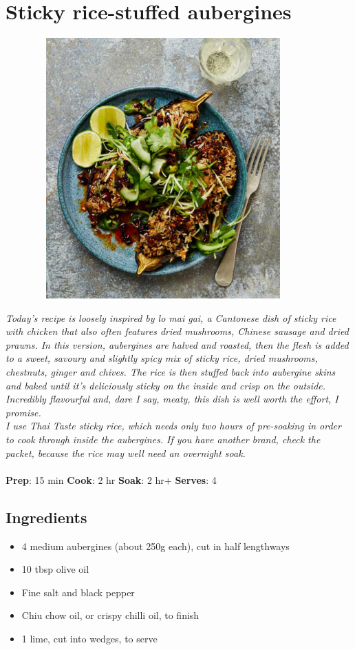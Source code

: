 \documentclass{book}
\begin{document}
\section{Sticky rice-stuffed aubergines}
\begin{figure}
\centering\includegraphics[width=10cm,height=10cm,keepaspectratio]{Recipe_Pictures/Sticky_rice-stuffed_aubergines.png}
\end{figure}
\emph{Today’s recipe is loosely inspired by lo mai gai, a Cantonese dish of sticky rice with chicken that also often features dried mushrooms, Chinese sausage and dried prawns. In this version, aubergines are halved and roasted, then the flesh is added to a sweet, savoury and slightly spicy mix of sticky rice, dried mushrooms, chestnuts, ginger and chives. The rice is then stuffed back into aubergine skins and baked until it’s deliciously sticky on the inside and crisp on the outside. Incredibly flavourful and, dare I say, meaty, this dish is well worth the effort, I promise.\\ 
I use Thai Taste sticky rice, which needs only two hours of pre-soaking in order to cook through inside the aubergines. If you have another brand, check the packet, because the rice may well need an overnight soak.}\\\\ 
\textbf{Prep}: 15 min
\textbf{Cook}: 2 hr
\textbf{Soak}: 2 hr+
\textbf{Serves}: 4
\subsection*{Ingredients}
\begin{itemize}
\item 4 medium aubergines (about 250g each), cut in half lengthways
\item 10 tbsp olive oil
\item Fine salt and black pepper
\item Chiu chow oil, or crispy chilli oil, to finish
\item 1 lime, cut into wedges, to serve
\end{itemize}
\end{document}
